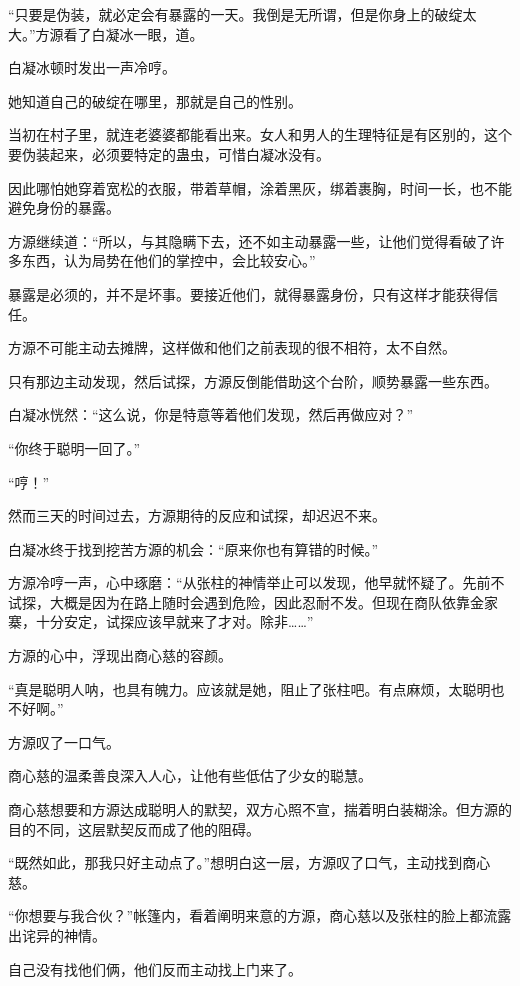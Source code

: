 \begin{this_body}
“只要是伪装，就必定会有暴露的一天。我倒是无所谓，但是你身上的破绽太大。”方源看了白凝冰一眼，道。

白凝冰顿时发出一声冷哼。

她知道自己的破绽在哪里，那就是自己的性别。

当初在村子里，就连老婆婆都能看出来。女人和男人的生理特征是有区别的，这个要伪装起来，必须要特定的蛊虫，可惜白凝冰没有。

因此哪怕她穿着宽松的衣服，带着草帽，涂着黑灰，绑着裹胸，时间一长，也不能避免身份的暴露。

方源继续道：“所以，与其隐瞒下去，还不如主动暴露一些，让他们觉得看破了许多东西，认为局势在他们的掌控中，会比较安心。”

暴露是必须的，并不是坏事。要接近他们，就得暴露身份，只有这样才能获得信任。

方源不可能主动去摊牌，这样做和他们之前表现的很不相符，太不自然。

只有那边主动发现，然后试探，方源反倒能借助这个台阶，顺势暴露一些东西。

白凝冰恍然：“这么说，你是特意等着他们发现，然后再做应对？”

“你终于聪明一回了。”

“哼！”

然而三天的时间过去，方源期待的反应和试探，却迟迟不来。

白凝冰终于找到挖苦方源的机会：“原来你也有算错的时候。”

方源冷哼一声，心中琢磨：“从张柱的神情举止可以发现，他早就怀疑了。先前不试探，大概是因为在路上随时会遇到危险，因此忍耐不发。但现在商队依靠金家寨，十分安定，试探应该早就来了才对。除非……”

方源的心中，浮现出商心慈的容颜。

“真是聪明人呐，也具有魄力。应该就是她，阻止了张柱吧。有点麻烦，太聪明也不好啊。”

方源叹了一口气。

商心慈的温柔善良深入人心，让他有些低估了少女的聪慧。

商心慈想要和方源达成聪明人的默契，双方心照不宣，揣着明白装糊涂。但方源的目的不同，这层默契反而成了他的阻碍。

“既然如此，那我只好主动点了。”想明白这一层，方源叹了口气，主动找到商心慈。

“你想要与我合伙？”帐篷内，看着阐明来意的方源，商心慈以及张柱的脸上都流露出诧异的神情。

自己没有找他们俩，他们反而主动找上门来了。


\end{this_body}
